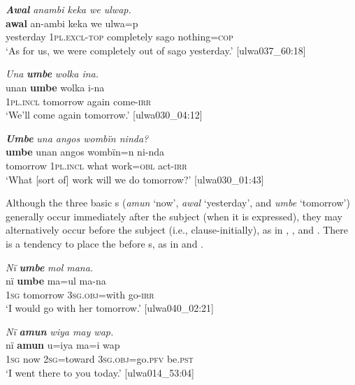 \ea%
    \label{ex:otherwc:39}
          \textbf{\textit{Awal}} \textit{anambi keka we ulwap.}\\
\gll    \textbf{awal}    an-ambi    keka      we    ulwa=p\\
    yesterday  1\textsc{pl.excl-top}  completely  sago  nothing=\textsc{cop}\\
\glt `As for us, we were completely out of sago yesterday.’ [ulwa037\_60:18]
\z

\ea%
    \label{ex:otherwc:40}
          \textit{Una} \textbf{\textit{umbe}} \textit{wolka ina.}\\
\gll    unan    \textbf{umbe}    wolka  i-na\\
    1\textsc{pl.incl}  tomorrow  again  come-\textsc{irr}\\
\glt `We’ll come again tomorrow.’ [ulwa030\_04:12]
\z

\ea%
    \label{ex:otherwc:41}
          \textbf{\textit{Umbe}} \textit{una angos wombïn ninda?}\\
\gll    \textbf{umbe}    unan    angos  wombïn=n  ni-nda\\
    tomorrow  1\textsc{pl.incl}  what  work=\textsc{obl}  act-\textsc{irr}\\
\glt `What [sort of] work will we do tomorrow?’ [ulwa030\_01:43]
\z

Although the three basic s (\textit{amun} ‘now’, \textit{awal} ‘yesterday’, and \textit{umbe} ‘tomorrow’) generally occur immediately after the subject (when it is expressed), they may alternatively occur before the subject (i.e., clause-initially), as in , , and . There is a tendency to place the  before s, as in  and .

\ea%
    \label{ex:otherwc:42}
          \textit{Nï} \textbf{\textit{umbe}} \textit{mol mana.}\\
\gll    nï    \textbf{umbe}    ma=ul      ma-na\\
    1\textsc{sg}  tomorrow  3\textsc{sg.obj}=with  go-\textsc{irr}\\
\glt `I would go with her tomorrow.’ [ulwa040\_02:21]
\z

\ea%
    \label{ex:otherwc:43}
          \textit{Nï} \textbf{\textit{amun}} \textit{wiya may wap.}\\
\gll    nï    \textbf{amun}  u=iya      ma=i        wap\\
    1\textsc{sg}  now  2\textsc{sg}=toward  3\textsc{sg.obj}=go.\textsc{pfv}  be.\textsc{pst}\\
\glt `I went there to you today.’ [ulwa014\_53:04]
\z

